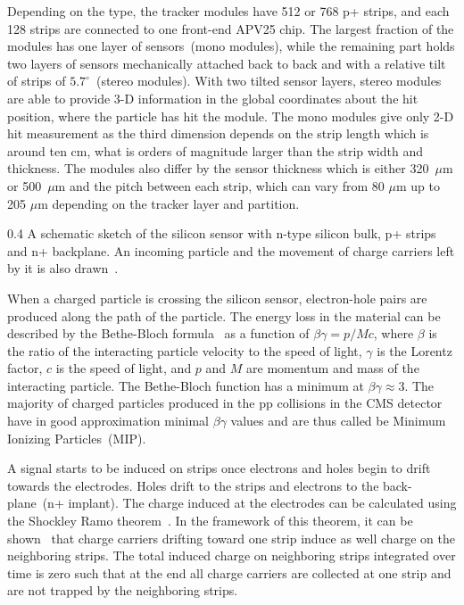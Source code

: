 Depending on the type, the tracker modules have 512 or 768 p+ strips, and each 128 strips are connected to one front-end APV25 chip. The largest fraction of the modules has one layer of sensors~(mono modules), while the remaining part holds two layers of sensors  mechanically attached back to back and with a relative tilt of strips of $5.7^{\circ}$~(stereo modules). With two tilted sensor layers, stereo modules are able to provide 3-D information in the global coordinates about the hit position, where the particle has hit the module. The mono modules give only 2-D hit measurement as the third dimension depends on the strip length which is around ten cm, what is orders of magnitude larger than the strip width and thickness. The modules also differ by the sensor thickness which is either 320~$\mu$m or 500~$\mu$m and the pitch between each strip, which can vary from 80 $\mu$m up to 205 $\mu$m depending on the tracker layer and partition.

                 {0.4}       %
                 {A schematic sketch of the silicon sensor with n-type silicon bulk, p+ strips and n+ backplane. An incoming particle and the movement of charge carriers left by it is also drawn~\cite{website:sensor}. } %

When a charged particle is crossing the silicon sensor, electron-hole pairs are produced along the path of the particle. The energy loss in the material can be described by the Bethe-Bloch formula~\cite{Groom:2000sm} as a function of $\beta\gamma = p/Mc$, where $\beta$ is the ratio of the interacting particle velocity to the speed of light, $\gamma$ is the Lorentz factor, $c$ is the speed of light, and $p$ and $M$ are momentum and mass of the interacting particle. The Bethe-Bloch function has a minimum at $\beta\gamma \approx 3$. The majority of charged particles produced in the pp collisions in the CMS detector have in good approximation minimal $\beta\gamma$ values and are thus called be Minimum Ionizing Particles~(MIP).

A signal starts to be induced on strips once electrons and holes begin to drift towards the electrodes. Holes drift to the strips and electrons to the back-plane~(n+ implant). The charge induced at the electrodes can be calculated using the Shockley Ramo theorem~\cite{doi:10.1063/1.1710367,Ramo:1939vr}. In the framework of this theorem, it can be shown~\cite{Bloch:2007zza} that charge carriers drifting toward one strip induce as well charge on the neighboring strips. The total induced charge on neighboring strips integrated over time is zero such that at the end all charge carriers are collected at one strip and are not trapped by the neighboring strips.

